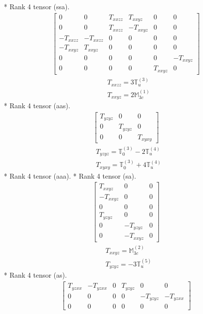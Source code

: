 \documentclass[fleqn,8pt,landscape]{jsarticle}
\begin{document}
* Rank 4 tensor (ssa).
\begin{align*}
\begin{bmatrix} 0 & 0 & T_{xxzz} & T_{xxyz} & 0 & 0 \\ 0 & 0 & T_{xxzz} & - T_{xxyz} & 0 & 0 \\ - T_{xxzz} & - T_{xxzz} & 0 & 0 & 0 & 0 \\ - T_{xxyz} & T_{xxyz} & 0 & 0 & 0 & 0 \\ 0 & 0 & 0 & 0 & 0 & - T_{xxyz} \\ 0 & 0 & 0 & 0 & T_{xxyz} & 0 \end{bmatrix}
\end{align*}
\begin{align*}
& T_{xxzz} = 3 \mathbb{T}_{u}^{(3)} \\
& T_{xxyz} = 2 \mathbb{M}_{3c}^{(1)}
\end{align*}
* Rank 4 tensor (aas).
\begin{align*}
\begin{bmatrix} T_{yzyz} & 0 & 0 \\ 0 & T_{yzyz} & 0 \\ 0 & 0 & T_{xyxy} \end{bmatrix}
\end{align*}
\begin{align*}
& T_{yzyz} = \mathbb{T}_{0}^{(3)} - 2 \mathbb{T}_{u}^{(4)} \\
& T_{xyxy} = \mathbb{T}_{0}^{(3)} + 4 \mathbb{T}_{u}^{(4)}
\end{align*}
* Rank 4 tensor (aaa).
* Rank 4 tensor (sa).
\begin{align*}
\begin{bmatrix} T_{xxyz} & 0 & 0 \\ - T_{xxyz} & 0 & 0 \\ 0 & 0 & 0 \\ T_{yzyz} & 0 & 0 \\ 0 & - T_{yzyz} & 0 \\ 0 & - T_{xxyz} & 0 \end{bmatrix}
\end{align*}
\begin{align*}
& T_{xxyz} = \mathbb{M}_{3c}^{(2)} \\
& T_{yzyz} = - 3 \mathbb{T}_{u}^{(5)}
\end{align*}
* Rank 4 tensor (as).
\begin{align*}
\begin{bmatrix} T_{yzxx} & - T_{yzxx} & 0 & T_{yzyz} & 0 & 0 \\ 0 & 0 & 0 & 0 & - T_{yzyz} & - T_{yzxx} \\ 0 & 0 & 0 & 0 & 0 & 0 \end{bmatrix}
\end{align*}
\end{document}
